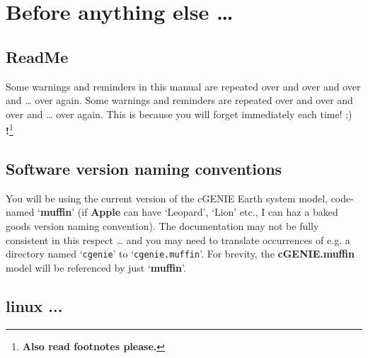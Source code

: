 \documentclass[11pt,fleqn]{book} %
\begin{document}

\newpage


\section{Before anything else …}


\subsection*{ReadMe}

Some warnings and reminders in this manual are repeated over and over and over and … over again.
Some warnings and reminders are repeated over and over and over and … over again.  
This is because you will forget immediately each time! ;)
\\\textbf{!}\footnote{\textbf{Also read footnotes please.}}


\subsection*{Software version naming conventions}

You will be using the current version of the cGENIE Earth system model, code-named ‘\textbf{muffin}’ (if \textbf{Apple} can have ‘Leopard’, ‘Lion’ etc., I can haz a baked goods version naming convention). The documentation may not be fully consistent in this respect … and you may need to translate occurrences of e.g. a directory named ‘\texttt{cgenie}’ to ‘\texttt{cgenie.muffin}’. For brevity, the \textbf{cGENIE.muffin} model will be referenced by just ‘\textbf{muffin}’.
 

\subsection*{linux ...}
\end{document}
